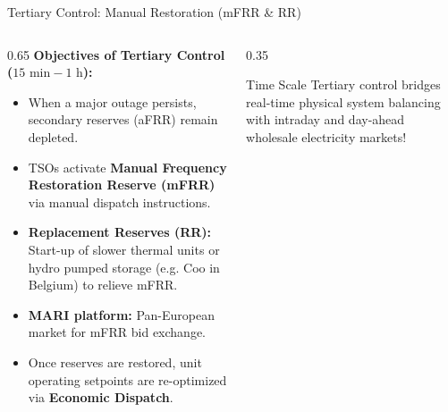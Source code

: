 \begin{frame}{Tertiary Control: Manual Restoration (mFRR \& RR)}
\begin{columns}[T]
\begin{column}{0.65\textwidth}
    \footnotesize
    \textbf{Objectives of Tertiary Control ($15\text{ min} - 1\text{ h}$):}
    \begin{itemize}\setlength{\itemsep}{3pt}
        \item When a major outage persists, secondary reserves (aFRR) remain depleted.
        \item TSOs activate \textbf{Manual Frequency Restoration Reserve (mFRR)} via manual dispatch instructions.
        \item \textbf{Replacement Reserves (RR):} Start-up of slower thermal units or hydro pumped storage (e.g. Coo in Belgium) to relieve mFRR.
        \item \textbf{MARI platform:} Pan-European market for mFRR bid exchange.
        \item Once reserves are restored, unit operating setpoints are re-optimized via \textbf{Economic Dispatch}.
    \end{itemize}
\end{column}
\begin{column}{0.35\textwidth}
    \begin{block}{Time Scale}
    \scriptsize
    Tertiary control bridges real-time physical system balancing with intraday and day-ahead wholesale electricity markets!
    \end{block}
\end{column}
\end{columns}
\end{frame}

